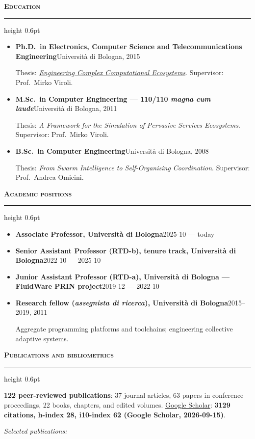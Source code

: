 \documentclass[a4paper,9pt]{extarticle}
\providecommand{\scholarsummary}{3129 citations, h-index 28, i10-index 62
  (Google Scholar, 2026-09-15)}
\newcommand{\cvsection}[1]{%
  \par\vspace{3.5pt}%
  {\normalsize\bfseries\scshape #1}\par\vspace{1pt}%
  \hrule height 0.6pt\vspace{2.5pt}\par}
\newcommand{\entry}[2]{\textbf{#1}\hspace{1em}\hfill{\small #2}\par}
\begin{document}
\cvsection{Education}
\begin{itemize}
\item \entry{Ph.D.\ in Electronics, Computer Science and Telecommunications Engineering}{Universit\`a di Bologna, 2015}
      Thesis: \href{http://amsdottorato.unibo.it/7000/}{\emph{Engineering Complex Computational Ecosystems}}.
      Supervisor: Prof.\ Mirko Viroli.
\item \entry{M.Sc.\ in Computer Engineering --- 110/110 \emph{magna cum laude}}{Universit\`a di Bologna, 2011}
      Thesis: \emph{A Framework for the Simulation of Pervasive Services Ecosystems}.
      Supervisor: Prof.\ Mirko Viroli.
\item \entry{B.Sc.\ in Computer Engineering}{Universit\`a di Bologna, 2008}
      Thesis: \emph{From Swarm Intelligence to Self-Organising Coordination}.
      Supervisor: Prof.\ Andrea Omicini.
\end{itemize}

\cvsection{Academic positions}
\begin{itemize}
\item \entry{Associate Professor, Universit\`a di Bologna}{2025-10 --- today}
\item \entry{Senior Assistant Professor (RTD-b), tenure track, Universit\`a di Bologna}{2022-10 --- 2025-10}
\item \entry{Junior Assistant Professor (RTD-a), Universit\`a di Bologna --- FluidWare PRIN project}{2019-12 --- 2022-10}
\item \entry{Research fellow (\emph{assegnista di ricerca}), Universit\`a di Bologna}{2015--2019, 2011}
      Aggregate programming platforms and toolchains; engineering collective adaptive systems.
\end{itemize}

\cvsection{Publications and bibliometrics}
\textbf{122 peer-reviewed publications}: 37 journal articles, 63 papers in conference
proceedings, 22 books, chapters, and edited volumes.
\href{https://scholar.google.com/citations?user=0CLlt5oAAAAJ&hl=en}{Google Scholar}:
\textbf{\scholarsummary}.\par
\vspace{2pt}
\textit{Selected publications:}\par
\nocite{DBLP:journals/tosem/CasadeiAADPSTV25,JLAMP2019,TOMACS2018,
        BealIEEEComputer2015,PianiniSAC2015,PianiniJOS2013}
{\small\printbibliography[heading=none]}
\end{document}
